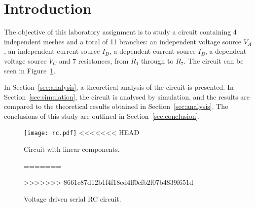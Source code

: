 \section{Introduction}
\label{sec:introduction}

The objective of this laboratory assignment is to study a circuit containing 4 independent meshes and a total of 11 branches: an independent voltage source $V_A$, an independent current source $I_D$, a dependent current source $I_B$, a dependent voltage source $V_C$ and 7 resistances, from $R_1$ through to $R_7$. The circuit can be seen in Figure~\ref{fig:rc}.

In Section~\ref{sec:analysis}, a theoretical analysis of the circuit is
presented. In Section~\ref{sec:simulation}, the circuit is analysed by
simulation, and the results are compared to the theoretical results obtained in
Section~\ref{sec:analysis}. The conclusions of this study are outlined in
Section~\ref{sec:conclusion}.

\begin{figure}[h] \centering
\texttt{[image: rc.pdf]}
<<<<<<< HEAD
\caption{Circuit with linear components.}
=======
\caption{Voltage driven serial RC circuit.}
>>>>>>> 8661c87d12b1f4f18ed4ff0cfb2f07b4839f651d
\label{fig:rc}
\end{figure}

